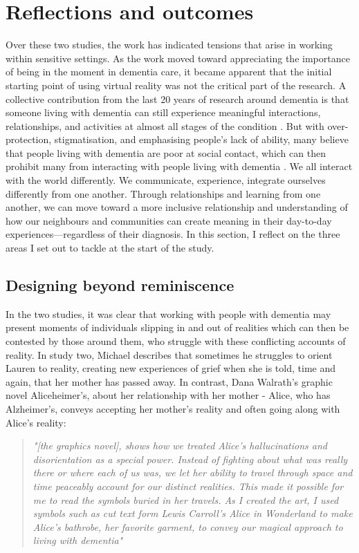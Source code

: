 \section{Reflections and outcomes}
\label{S2:Reflection}
Over these two studies, the work has indicated tensions that arise in working within sensitive settings. As the work moved toward appreciating the importance of being in the moment in dementia care, it became apparent that the initial starting point of using virtual reality was not the critical part of the research. A collective contribution from the last 20 years of research around dementia is that someone living with dementia can still experience meaningful interactions, relationships, and activities at almost all stages of the condition \citep{kitwood1997dementia}. But with over-protection, stigmatisation, and emphasising people’s lack of ability, many believe that people living with dementia are poor at social contact, which can then prohibit many from interacting with people living with dementia \citep{christine_bryden_dancing_2005, riley_anxiety_2014}. We all interact with the world differently. We communicate, experience, integrate ourselves differently from one another. Through relationships and learning from one another, we can move toward a more inclusive relationship and understanding of how our neighbours and communities can create meaning in their day-to-day experiences—regardless of their diagnosis. In this section, I reflect on the three areas I set out to tackle at the start of the study.

\subsection{Designing beyond reminiscence}
\label{beyond-reminiscence}
In the two studies, it was clear that working with people with dementia may present moments of individuals slipping in and out of realities which can then be contested by those around them, who struggle with these conflicting accounts of reality. In study two, Michael describes that sometimes he struggles to orient Lauren to reality, creating new experiences of grief when she is told, time and again, that her mother has passed away. In contrast, Dana Walrath's graphic novel Aliceheimer's, about her relationship with her mother - Alice, who has Alzheimer's, conveys accepting her mother's reality and often going along with Alice's reality:

\begin{quote}
\textit{"[the graphics novel], shows how we treated Alice's hallucinations and disorientation as a special power. Instead of fighting about what was really there or where each of us was, we let her ability to travel through space and time peaceably account for our distinct realities. This made it possible for me to read the symbols buried in her travels. As I created the art, I used symbols such as cut text form Lewis Carroll's Alice in Wonderland to make Alice's bathrobe, her favorite garment, to convey our magical approach to living with dementia" \citep{walrath2021aliceheimer,walrath2017end}}
\end{quote}

